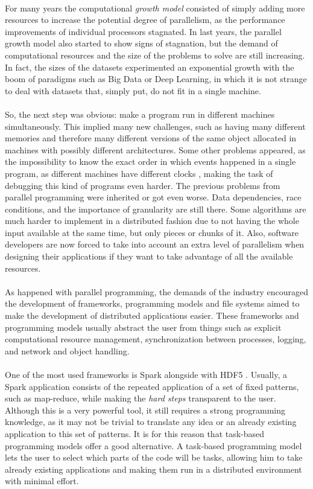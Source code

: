 \\
For many years the computational \textit{growth model} consisted of simply adding more resources to increase the potential degree of parallelism, as the performance improvements of individual processors stagnated. In last years, the parallel growth model also started to show signs of stagnation, but the demand of computational resources and the size of the problems to solve are still increasing. In fact, the sizes of the datasets experimented an exponential growth with the boom of paradigms such as Big Data or Deep Learning, in which it is not strange to deal with datasets that, simply put, do not fit in a single machine.\\
\\
So, the next step was obvious: make a program run in different machines simultaneously. This implied many new challenges, such as having many different memories and therefore many different versions of the same object allocated in machines with possibly different architectures. Some other problems appeared, as the impossibility to know the exact order in which events happened in a single program, as different machines have different clocks \cite{Lamport}, making the task of debugging this kind of programs even harder. The previous problems from parallel programming were inherited or got even worse. Data dependencies, race conditions, and the importance of granularity are still there. Some algorithms are much harder to implement in a distributed fashion due to not having the whole input available at the same time, but only pieces or chunks of it. Also, software developers are now forced to take into account an extra level of parallelism when designing their applications if they want to take advantage of all the available resources.\\
\\
As happened with parallel programming, the demands of the industry encouraged the development of frameworks, programming models and file systems aimed to make the development of distributed applications easier. These frameworks and programming models usually abstract the user from things such as explicit computational resource management, synchronization between processes, logging, and network and object handling.\\
\\
One of the most used frameworks is Spark \cite{Zaharia:2010:SCC:1863103.1863113} alongside with HDF5 \cite{shvachko2010hadoop}. Usually, a Spark application consists of the repeated application of a set of fixed patterns, such as map-reduce, while making the \textit{hard steps} transparent to the user. Although this is a very powerful tool, it still requires a strong programming knowledge, as it may not be trivial to translate any idea or an already existing application to this set of patterns. It is for this reason that task-based programming models offer a good alternative. A task-based programming model lets the user to select which parts of the code will be tasks, allowing him to take already existing applications and making them run in a distributed environment with minimal effort.
